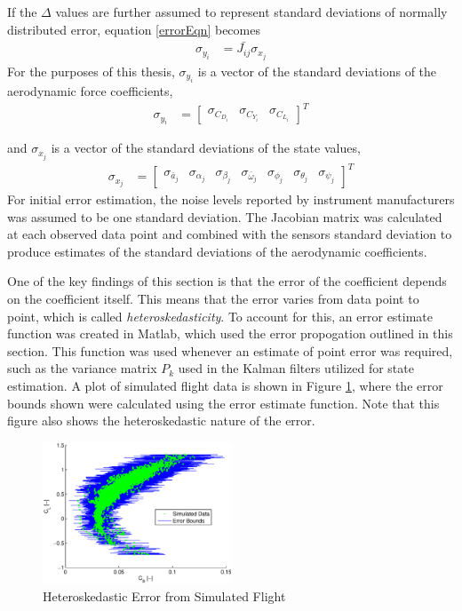 If the $\Delta$ values are further assumed to represent standard deviations of normally distributed error, equation \ref{errorEqn} becomes
\begin{align}
\sigma_{y_i} &= \bar{J_{ij}} \sigma_{x_j}
\end{align}
For the purposes of this thesis, $\sigma_{y_i}$ is a vector of the standard deviations of the aerodynamic force coefficients,
\begin{align}
\sigma_{y_i} &= \begin{bmatrix} \sigma_{C_{D_i}} & \sigma_{C_{Y_i}} & \sigma_{C_{L_i}} \end{bmatrix}^T
\end{align}

and $\sigma_{x_j}$ is a vector of the standard deviations of the state values,
\begin{align}
\sigma_{x_j} &= \begin{bmatrix} \sigma_{\bar{a}_j} & \sigma_{\alpha_j} & \sigma_{\beta_j} & \sigma_{\bar{\omega}_j} & \sigma_{\phi_j} & \sigma_{\theta_j} & \sigma_{\psi_j}\end{bmatrix}^T
\end{align}
For initial error estimation, the noise levels reported by instrument manufacturers was assumed to be one standard deviation. The Jacobian matrix was calculated at each observed data point and combined with the sensors standard deviation to produce estimates of the standard deviations of the aerodynamic coefficients.

One of the key findings of this section is that the error of the coefficient depends on the coefficient itself. This means that the error varies from data point to point, which is called \textit{heteroskedasticity}. To account for this, an error estimate function was created in Matlab, which used the error propogation outlined in this section. This function was used whenever an estimate of point error was required, such as the variance matrix $P_k$ used in the Kalman filters utilized for state estimation. A plot of simulated flight data is shown in Figure \ref{errorBndFigure}, where the error bounds shown were calculated using the error estimate function. Note that this figure also shows the heteroskedastic nature of the error.

\begin{figure}[h!]
  \caption{Heteroskedastic Error from Simulated Flight} \label{errorBndFigure}
  \centering
    \includegraphics[width=0.5\textwidth]{figures/heteroskedasticity.eps}
\end{figure}

